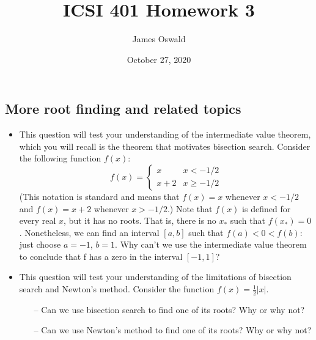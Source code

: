 \documentclass{article}
\author{James Oswald}
\date{October 27, 2020}
\title{ICSI 401 Homework 3}
\begin{document}
\maketitle
\thispagestyle{fancy}
\addtocounter{section}{3}
\subsection{More root finding and related topics}
\begin{itemize}
    \item This question will test your understanding of the intermediate value theorem, which you will recall is the theorem that motivates bisection search. Consider the following function $f(x)$:
    \[f(x) = \begin{cases} x & x< -1/2 \\ x + 2 & x\geq-1/2 \end{cases}\]
    (This notation is standard and means that $f(x) = x$ whenever $x < −1/2$ and $f(x) = x + 2$ whenever $x > −1/2$.) Note that $f(x)$ is defined for every real $x$, but it has no roots. That is, there is no $x_*$ such that $f(x_*) = 0$. Nonetheless, we can find an interval $[a, b]$ such that $f(a) < 0 < f(b)$: just choose $a = −1$, $b = 1$. Why can’t we use the intermediate value theorem to conclude that f has a zero in the interval $[−1, 1]$?
    
    \item This question will test your understanding of the limitations of bisection search and Newton’s method. Consider the function $f(x) = \frac{1}{2}|x|$.
    \begin{itemize}
        \item[--] Can we use bisection search to find one of its roots? Why or why not?
        \item[--] Can we use Newton’s method to find one of its roots? Why or why not?
    \end{itemize}
\end{itemize}
\end{document}
